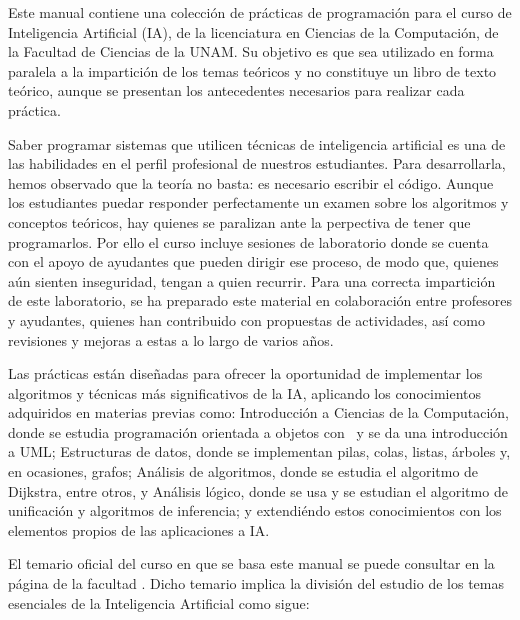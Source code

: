 
Este manual contiene una colección de prácticas de programación para el curso de Inteligencia Artificial (IA), de la licenciatura en Ciencias de la Computación, de la Facultad de Ciencias de la UNAM.  Su objetivo es que sea utilizado en forma paralela a la impartición de los temas teóricos y no constituye un libro de texto teórico, aunque se presentan los antecedentes necesarios para realizar cada práctica.

Saber programar sistemas que utilicen técnicas de inteligencia artificial es una de las habilidades en el perfil profesional de nuestros estudiantes.  Para desarrollarla, hemos observado que la teoría no basta: es necesario escribir el código.  Aunque los estudiantes puedar responder perfectamente un examen sobre los algoritmos y conceptos teóricos, hay quienes se paralizan ante la perpectiva de tener que programarlos.  Por ello el curso incluye sesiones de laboratorio donde se cuenta con el apoyo de ayudantes que pueden dirigir ese proceso, de modo que, quienes aún sienten inseguridad, tengan a quien recurrir.  Para una correcta impartición de este laboratorio, se ha preparado este material en colaboración entre profesores y ayudantes, quienes han contribuido con propuestas de actividades, así como revisiones y mejoras a estas a lo largo de varios años.

Las prácticas están diseñadas para ofrecer la oportunidad de implementar los algoritmos y técnicas más significativos de la IA, aplicando los conocimientos adquiridos en materias previas como: Introducción a Ciencias de la Computación, donde se estudia programación orientada a objetos con \Java\ y se da una introducción a UML; Estructuras de datos, donde se implementan pilas, colas, listas, árboles y, en ocasiones, grafos; Análisis de algoritmos, donde se estudia el algoritmo de Dijkstra, entre otros, y Análisis lógico, donde se usa  y se estudian el algoritmo de unificación y algoritmos de inferencia; y extendiéndo estos conocimientos con los elementos propios de las aplicaciones a IA.

El temario oficial del curso en que se basa este manual se puede consultar en la página de la facultad .  Dicho temario implica la división del estudio de los temas esenciales de la Inteligencia Artificial como sigue:

